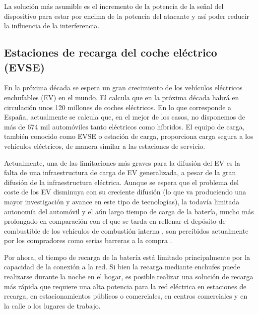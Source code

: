 \documentclass[12pt,a4paper,onecolumn,oneside]{report}
\begin{document}
\begin{enumerate}
\begin{enumerate}
La solución más asumible es el incremento de la potencia de la señal del dispositivo para estar por encima de la potencia del atacante y así poder reducir la influencia de la interferencia.



\end{enumerate}


\end{enumerate}




\subsection{Estaciones de recarga del coche eléctrico (EVSE)}
\label{Estaciones de recarga del coche eléctrico (EVSE)}

En la próxima década se espera un gran crecimiento de los vehículos eléctricos enchufables (EV) en el mundo. El calcula que en la próxima década habrá en circulación unos 120 millones de coches eléctricos. En lo que corresponde a España, actualmente se calcula que, en el mejor de los casos, no disponemos de más de 674 mil automóviles tanto eléctricos como híbridos. El equipo de carga, también conocido como EVSE o estación de carga, proporciona carga segura a los vehículos eléctricos, de manera similar a las estaciones de servicio. 

Actualmente, una de las limitaciones más graves para la difusión del EV es la falta de una infraestructura de carga de EV generalizada, a pesar de la gran difusión de la infraestructura eléctrica. Aunque se espera que el problema del coste de los EV disminuya con su creciente difusión (lo que va produciendo una mayor investigación y avance en este tipo de tecnologías), la todavía limitada autonomía del automóvil y el aún largo tiempo de carga de la batería, mucho más prolongado en comparación con el que se tarda en rellenar el depósito de combustible de los vehículos de combustión interna \cite{diezuno}, son percibidos actualmente por los compradores como serias barreras a la compra \cite{diezdos}\cite{dieztres}.

Por ahora, el tiempo de recarga de la batería está limitado principalmente por la capacidad de la conexión a la red. Si bien la recarga mediante enchufes puede realizarse durante la noche en el hogar, es posible realizar una solución de recarga más rápida que requiere una alta potencia para la red eléctrica en estaciones de recarga, en estacionamientos públicos o comerciales, en centros comerciales y en la calle o los lugares de trabajo.
\end{document}
